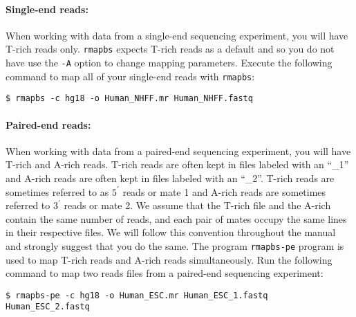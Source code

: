 \documentclass[10pt]{article}
\newcommand{\prog}[1]{\texttt{#1}}
\newcommand{\op}[1]{\texttt{#1}}
\begin{document}









\paragraph{Single-end reads:}
When working with data from a single-end sequencing experiment, you
will have T-rich reads only. \prog{rmapbs} expects T-rich reads as a
default and so you do not have use the \op{-A} option to change
mapping parameters. Execute the following command to map all of your
single-end reads with \prog{rmapbs}:
\begin{verbatim}
$ rmapbs -c hg18 -o Human_NHFF.mr Human_NHFF.fastq
\end{verbatim}

\paragraph{Paired-end reads:}
When working with data from a paired-end sequencing experiment, you
will have T-rich and A-rich reads. T-rich reads are often kept in
files labeled with an ``\_1'' and A-rich reads are often kept in files
labeled with an ``\_2''.  T-rich reads are sometimes referred to as
$5^{\prime}$ reads or mate 1 and A-rich reads are sometimes referred
to $3^{\prime}$ reads or mate 2. We assume that the T-rich file and
the A-rich contain the same number of reads, and each pair of mates
occupy the same lines in their respective files. We will follow this
convention throughout the manual and strongly suggest that you do the
same. The program \prog{rmapbs-pe} program is used to map T-rich reads
and A-rich reads simultaneously. Run the following command to map two
reads files from a paired-end sequencing experiment:
\begin{verbatim}
$ rmapbs-pe -c hg18 -o Human_ESC.mr Human_ESC_1.fastq Human_ESC_2.fastq
\end{verbatim}
\end{document}
